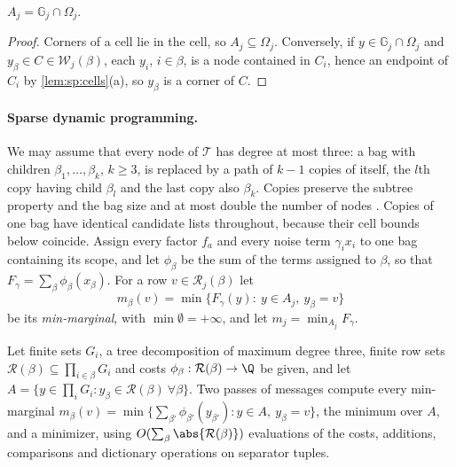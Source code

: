 \begin{lemma}\label{lem:sp:allowed}
$A_j=\mathbb G_j\cap\Omega_j$.
\end{lemma}

\begin{proof}
Corners of a cell lie in the cell, so $A_j\subseteq\Omega_j$. Conversely, if
$y\in\mathbb G_j\cap\Omega_j$ and $y_\beta\in C\in\mathcal W_j(\beta)$, each
$y_i$, $i\in\beta$, is a node contained in $C_i$, hence an endpoint of $C_i$
by \cref{lem:sp:cells}(a), so $y_\beta$ is a corner of $C$.
\end{proof}

\paragraph{Sparse dynamic programming.}
We may assume that every node of $\mathcal T$ has degree at most three:
a bag with children $\beta_1,\dots,\beta_k$, $k\ge3$, is replaced by a path
of $k-1$ copies of itself, the $l$th copy having child $\beta_l$ and the last
copy also $\beta_k$. Copies preserve the subtree property and the bag size
and at most double the number of nodes \citep{kloks1994-treewidth-computations-and-approximations}. Copies of one bag
have identical candidate lists throughout, because their cell bounds below
coincide. Assign every factor $f_a$ and every noise term $\gamma_ix_i$ to one
bag containing its scope, and let $\phi_\beta$ be the sum of the terms
assigned to $\beta$, so that $F_\gamma=\sum_\beta\phi_\beta(x_\beta)$. For a
row $v\in\mathcal R_j(\beta)$ let
\[
 m_\beta(v)=\min\{F_\gamma(y):\ y\in A_j,\ y_\beta=v\}
\]
be its \emph{min-marginal}, with $\min\emptyset=+\infty$, and let
$m_j=\min_{A_j}F_\gamma$.

\begin{lemma}\label{lem:sp:dp}
Let finite sets $G_i$, a tree decomposition of maximum degree three, finite
row sets $\mathcal R(\beta)\subseteq\prod_{i\in\beta}G_i$ and costs
$\phi_\beta:\mathcal R(\beta)\to\Q$ be given, and let
$A=\{y\in\prod_iG_i:y_\beta\in\mathcal R(\beta)\ \forall\beta\}$. Two passes
of messages compute every min-marginal
$m_\beta(v)=\min\{\sum_{\beta'}\phi_{\beta'}(y_{\beta'}):y\in A,\ y_\beta=v\}$,
the minimum over $A$, and a minimizer, using $O(\sum_\beta\abs{\mathcal R(\beta)})$
evaluations of the costs, additions, comparisons and dictionary operations
on separator tuples.
\end{lemma}

